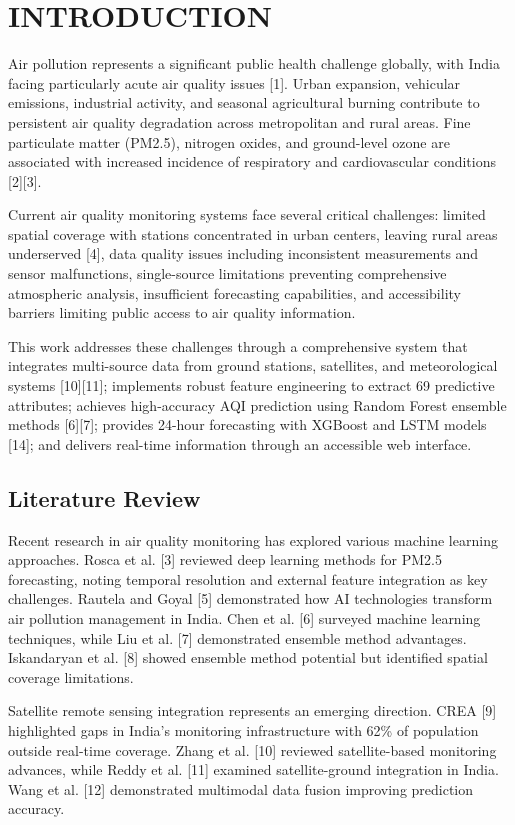 \documentclass[10pt,twocolumn]{article}
\begin{document}
\section{INTRODUCTION}

Air pollution represents a significant public health challenge globally, with India facing particularly acute air quality issues [1]. Urban expansion, vehicular emissions, industrial activity, and seasonal agricultural burning contribute to persistent air quality degradation across metropolitan and rural areas. Fine particulate matter (PM2.5), nitrogen oxides, and ground-level ozone are associated with increased incidence of respiratory and cardiovascular conditions [2][3].

Current air quality monitoring systems face several critical challenges: limited spatial coverage with stations concentrated in urban centers, leaving rural areas underserved [4], data quality issues including inconsistent measurements and sensor malfunctions, single-source limitations preventing comprehensive atmospheric analysis, insufficient forecasting capabilities, and accessibility barriers limiting public access to air quality information.

This work addresses these challenges through a comprehensive system that integrates multi-source data from ground stations, satellites, and meteorological systems [10][11]; implements robust feature engineering to extract 69 predictive attributes; achieves high-accuracy AQI prediction using Random Forest ensemble methods [6][7]; provides 24-hour forecasting with XGBoost and LSTM models [14]; and delivers real-time information through an accessible web interface.

\subsection{Literature Review}

Recent research in air quality monitoring has explored various machine learning approaches. Rosca et al. [3] reviewed deep learning methods for PM2.5 forecasting, noting temporal resolution and external feature integration as key challenges. Rautela and Goyal [5] demonstrated how AI technologies transform air pollution management in India. Chen et al. [6] surveyed machine learning techniques, while Liu et al. [7] demonstrated ensemble method advantages. Iskandaryan et al. [8] showed ensemble method potential but identified spatial coverage limitations.

Satellite remote sensing integration represents an emerging direction. CREA [9] highlighted gaps in India's monitoring infrastructure with 62\% of population outside real-time coverage. Zhang et al. [10] reviewed satellite-based monitoring advances, while Reddy et al. [11] examined satellite-ground integration in India. Wang et al. [12] demonstrated multimodal data fusion improving prediction accuracy.
\end{document}
